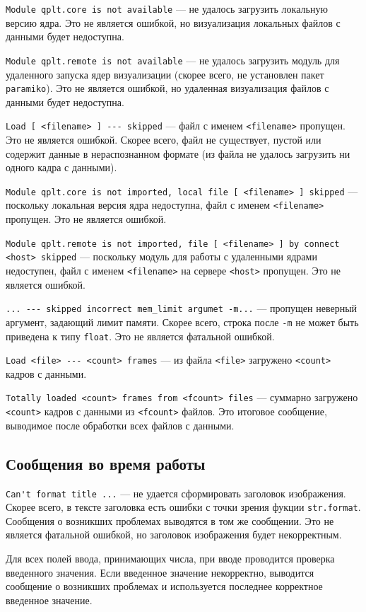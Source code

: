 \documentclass[12pt]{article}
\begin{document}
\begin{enumrate}
\verb'Module qplt.core is not available' --- не удалось загрузить локальную версию ядра. Это не является ошибкой, но визуализация локальных файлов с данными будет недоступна.

\verb'Module qplt.remote is not available' --- не удалось загрузить модуль для удаленного запуска ядер визуализации (скорее всего, не установлен пакет \verb'paramiko').
Это не является ошибкой, но удаленная визуализация файлов с данными будет недоступна.

\verb'Load [ <filename> ] --- skipped' --- файл с именем \verb'<filename>' пропущен. Это не является ошибкой.
Скорее всего, файл не существует, пустой или содержит данные в нераспознанном формате (из файла не удалось загрузить ни одного кадра с данными). 

\verb'Module qplt.core is not imported, local file [ <filename> ] skipped' --- поскольку локальная версия ядра недоступна,
файл с именем \verb'<filename>' пропущен. Это не является ошибкой.

\verb'Module qplt.remote is not imported, file [ <filename> ] by connect <host> skipped' --- поскольку модуль для работы с удаленными ядрами недоступен,
файл с именем \verb'<filename>'  на сервере \verb'<host>' пропущен. Это не является ошибкой.

\verb'... --- skipped incorrect mem_limit argumet -m...' --- пропущен неверный аргумент, задающий лимит памяти. Скорее всего, строка после \verb'-m'
не может быть приведена к типу \verb'float'. Это не является фатальной ошибкой.

\verb'Load <file> --- <count> frames' --- из файла \verb'<file>' загружено \verb'<count>' кадров с данными.

\verb'Totally loaded <count> frames from <fcount> files' --- суммарно загружено \verb'<count>' кадров с данными из \verb'<fcount>' файлов. Это итоговое сообщение,
выводимое после обработки всех файлов с данными.

\subsection{Сообщения во время работы}
\verb|Can't format title ...| --- не удается сформировать заголовок изображения. Скорее всего, в тексте заголовка есть ошибки с точки зрения фукции \verb'str.format'.
Сообщения о возникших проблемах выводятся в том же сообщении. Это не является фатальной ошибкой, но заголовок изображения будет некорректным.

Для всех полей ввода, принимающих числа, при вводе проводится проверка введенного значения. Если введенное значение некорректно, выводится сообщение
о возникших проблемах и используется последнее корректное введенное значение.


\end{enumrate}
\end{document}
